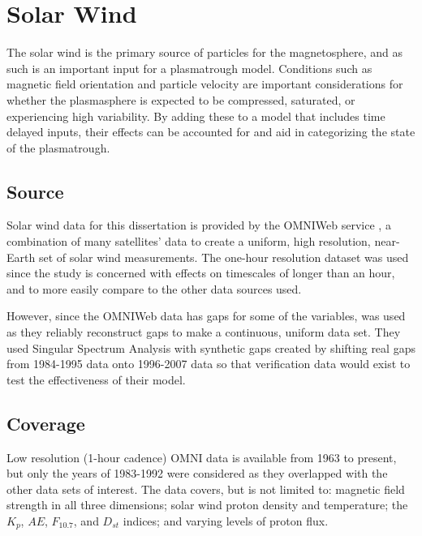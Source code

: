
\section{Solar Wind}
The solar wind is the primary source of particles for the magnetosphere, and as such is an important input for a plasmatrough model. Conditions such as magnetic field orientation and particle velocity are important considerations for whether the plasmasphere is expected to be compressed, saturated, or experiencing high variability. By adding these to a model that includes time delayed inputs, their effects can be accounted for and aid in categorizing the state of the plasmatrough.

\subsection{Source}
Solar wind data for this dissertation is provided by the OMNIWeb service \citep{OMNIWebKing2005}, a combination of many satellites' data to create a uniform, high resolution, near-Earth set of solar wind measurements. The one-hour resolution dataset was used since the study is concerned with effects on timescales of longer than an hour, and to more easily compare to the other data sources used. 

However, since the OMNIWeb data has gaps for some of the variables, \cite{Kondrashov2014ReconstructionOfGaps} was used as they reliably reconstruct gaps to make a continuous, uniform data set. They used Singular Spectrum Analysis with synthetic gaps created by shifting real gaps from 1984-1995 data onto 1996-2007 data so that verification data would exist to test the effectiveness of their model. 

\subsection{Coverage}
Low resolution (1-hour cadence) OMNI data is available from 1963 to present, but only the years of 1983-1992 were considered as they overlapped with the other data sets of interest. The data covers, but is not limited to: magnetic field strength in all three dimensions; solar wind proton density and temperature; the $K_p$, $AE$, $F_{10.7}$, and $D_{st}$ indices; and varying levels of proton flux.

